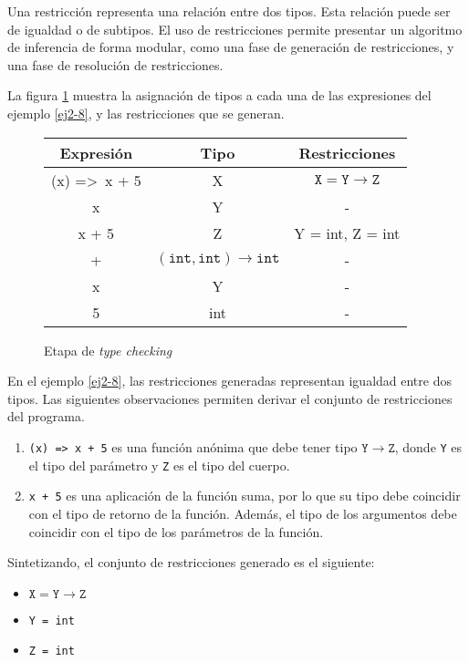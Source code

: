 Una restricción representa una relación entre dos tipos. Esta relación puede ser de igualdad o de subtipos. El uso de restricciones permite presentar un algoritmo de inferencia de forma modular, como una fase de generación de restricciones, y una fase de resolución de restricciones.

La figura \ref{tabla1} muestra la asignación de tipos a cada una de las expresiones del ejemplo \ref{ej2-8}, y las restricciones que se generan.


\begin{figure}[ht]
  \centering
  \ttfamily
  \begin{tabular}{c c c}
    Expresión & Tipo & Restricciones\\
    \hline
    (x) =>\ x + 5 & X & $\mathtt{X = Y \rightarrow Z}$\\
    x & Y & -\\
    x + 5 & Z & Y = int, Z = int\\
    + & $\mathtt{(int,int) \rightarrow int}$ & -\\
    x & Y & -\\
    5 & int & -\\
  \end{tabular}
  \caption{Etapa de \emph{type checking}}
  \label{tabla1}
\end{figure}

En el ejemplo \ref{ej2-8}, las restricciones generadas representan igualdad entre dos tipos. Las siguientes observaciones permiten derivar el conjunto de restricciones del programa.

\begin{enumerate}
  \item \texttt{(x) =>\ x + 5} es una función anónima que debe tener tipo $\mathtt{Y \rightarrow Z}$, donde \texttt{Y} es el tipo del parámetro y \texttt{Z} es el tipo del cuerpo.
  \item \texttt{x + 5} es una aplicación de la función suma, por lo que su tipo debe coincidir con el tipo de retorno de la función. Además, el tipo de los argumentos debe coincidir con el tipo de los parámetros de la función.
\end{enumerate}

Sintetizando, el conjunto de restricciones generado es el siguiente:

\begin{itemize}
  \item $\mathtt{X = Y \rightarrow Z}$
  \item \texttt{Y = int}
  \item \texttt{Z = int}
\end{itemize}

